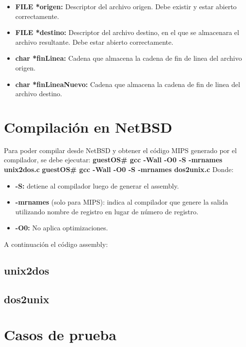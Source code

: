 \documentclass[a4paper,10pt]{article}
\begin{document}
  \begin{itemize}
  \item {\bf FILE *origen:}
    Descriptor del archivo origen. Debe existir y estar abierto correctamente.
  \item {\bf FILE *destino:}
    Descriptor del archivo destino, en el que se almacenara el archivo resultante. Debe estar abierto correctamente.
  \item {\bf char *finLinea:}
    Cadena que almacena la cadena de fin de linea del archivo origen.
  \item {\bf char *finLineaNuevo:}
    Cadena que almacena la cadena de fin de linea del archivo destino.
  \end{itemize}

\section{Compilaci\'on en NetBSD}
  Para poder compilar desde NetBSD y obtener el c\'odigo MIPS generado por el compilador, se debe ejecutar:
  \newline
  {\bf guestOS\# gcc -Wall -O0 -S -mrnames unix2dos.c} 
  \newline
  {\bf guestOS\# gcc -Wall -O0 -S -mrnames dos2unix.c}
  \newline
  Donde:
  \begin{itemize}
  \item {\bf-S:} detiene al compilador luego de generar el assembly.
  \item {\bf-mrnames} (solo para MIPS): indica al compilador que genere la salida utilizando nombre de 
    registro en lugar de n\'umero de registro.
  \item {\bf-O0:} No aplica optimizaciones.
  \end{itemize}
  A continuaci\'on el c\'odigo assembly:
  \subsection{unix2dos}
    \lstset{numbers=left, frame=single, breaklines=true}
    
  \subsection{dos2unix}
    \lstset{numbers=left, frame=single, breaklines=true}
    

\section{Casos de prueba}
\end{document}

